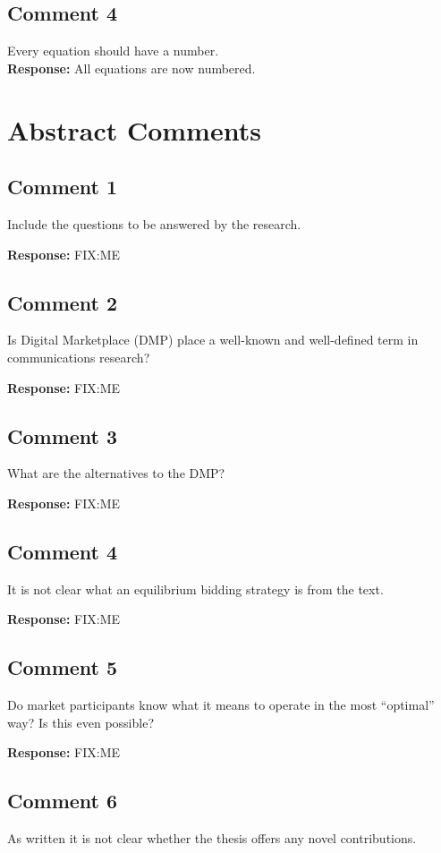 \documentclass[10pt,a4paper,notitlepage]{article}
\numberwithin{equation}{section}
\begin{document}
\subsection{Comment 4}
Every equation should have a number.\\[-2ex]

\textbf{Response:}
All equations are now numbered.

\clearpage

\setcounter{section}{0}
\renewcommand{\thesection}{A}
\renewcommand{\thesubsection}{A\arabic{subsection}}
\section{Abstract Comments}
\subsection{Comment 1}
Include the questions to be answered by the research.

\textbf{Response:}
FIX:ME

\subsection{Comment 2}
Is Digital Marketplace (DMP) place a well-known and well-defined term in communications research?

\textbf{Response:}
FIX:ME

\subsection{Comment 3}
What are the alternatives to the DMP?

\textbf{Response:}
FIX:ME

\subsection{Comment 4}
It is not clear what an equilibrium bidding strategy is from the text.

\textbf{Response:}
FIX:ME

\subsection{Comment 5}
Do market participants know what it means to operate in the most ``optimal'' way? Is this even possible?

\textbf{Response:}
FIX:ME

\subsection{Comment 6}
As written it is not clear whether the thesis offers any novel contributions.
\end{document}
